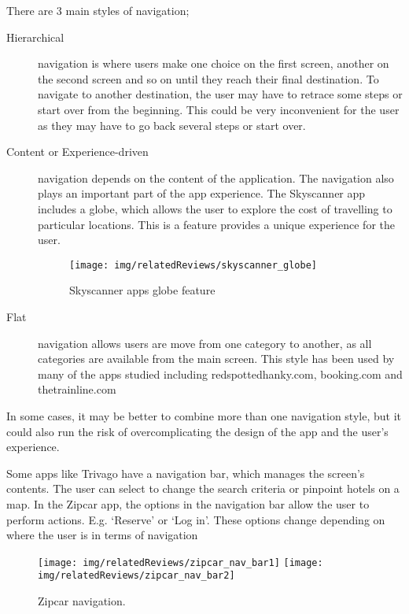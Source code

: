 There are 3 main styles of navigation;
\begin{description}
	\item[Hierarchical] navigation is where users make one choice on the first
		screen, another on the second screen and so on until they reach their
		final destination. To navigate to another destination, the user may
		have to retrace some steps or start over from the beginning. This could
		be very inconvenient for the user as they may have to go back several
		steps or start over.
	\item[Content or Experience-driven] navigation depends on the content of
		the application. The navigation also plays an important part of the app
		experience. The Skyscanner app includes a globe, which allows the user
		to explore the cost of travelling to particular locations. This is a
		feature provides a unique experience for the user.
		\begin{figure}[htbp]
			\begin{center}
				\texttt{[image: img/relatedReviews/skyscanner\_globe]}
			\end{center}
			\caption{Skyscanner apps globe feature}\label{fig:skyscanner_globe}
		\end{figure}

	\item[Flat] navigation allows users are move from one category to another,
		as all categories are available from the main screen. This style has
		been used by many of the apps studied including redspottedhanky.com,
		booking.com and thetrainline.com
\end{description}

In some cases, it may be better to combine more than one navigation style, but
it could also run the risk of overcomplicating the design of the app and the
user's experience.

Some apps like Trivago have a navigation bar, which manages the screen's
contents. The user can select to change the search criteria or pinpoint hotels
on a map. In the Zipcar app, the options in the navigation bar allow the user
to perform actions. E.g. `Reserve' or `Log in'. These options change depending
on where the user is in terms of navigation
\begin{figure}[htbp]
	\begin{center}
		\texttt{[image: img/relatedReviews/zipcar\_nav\_bar1]}
		\quad
		\texttt{[image: img/relatedReviews/zipcar\_nav\_bar2]}
	\end{center}
	\caption{Zipcar navigation\cite{ZipCarIOS}.}\label{fig:zipcar_nav_bar}
\end{figure}

